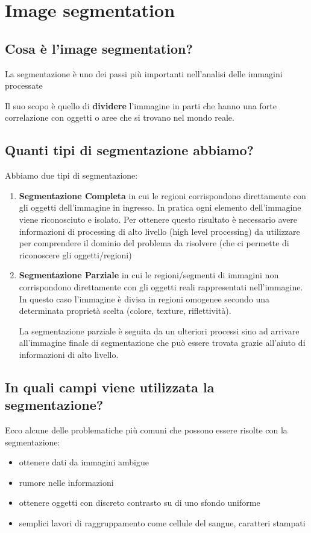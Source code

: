 \chapter{Image segmentation} \label{cha:seg}  

\section{Cosa è l'image segmentation?}
La segmentazione è uno dei passi più importanti nell'analisi delle immagini processate

Il suo scopo è quello di \textbf{dividere} l'immagine in parti che hanno una forte correlazione con oggetti o aree che si trovano nel mondo reale.

\section{Quanti tipi di segmentazione abbiamo?}
Abbiamo due tipi di segmentazione:

\begin{enumerate}
\item \textbf{Segmentazione Completa} in cui le regioni corrispondono direttamente con gli oggetti dell'immagine in ingresso. In pratica ogni elemento dell'immagine viene riconosciuto e isolato. Per ottenere questo risultato è necessario avere informazioni di processing di alto livello (high level processing) da utilizzare per comprendere il dominio del problema da risolvere (che ci permette di riconoscere gli oggetti/regioni)

\item \textbf{Segmentazione Parziale} in cui le regioni/segmenti di immagini non corrispondono direttamente con gli oggetti reali rappresentati nell'immagine. In questo caso l'immagine è divisa in regioni omogenee secondo una determinata proprietà scelta (colore, texture, riflettività).

La segmentazione parziale è seguita da un ulteriori processi sino ad arrivare all'immagine finale di segmentazione che può essere trovata grazie all'aiuto di informazioni di alto livello.
\end{enumerate}

\section{In quali campi viene utilizzata la segmentazione?}
Ecco alcune delle problematiche più comuni che possono essere risolte con la segmentazione:
\begin{itemize}
\item ottenere dati da immagini ambigue
\item rumore nelle informazioni
\item ottenere oggetti con discreto contrasto su di uno sfondo uniforme
\item semplici lavori di raggruppamento come cellule del sangue, caratteri stampati
\end{itemize}

